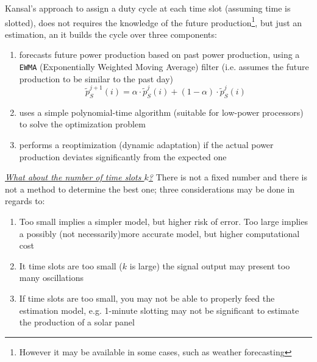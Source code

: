 Kansal's approach to assign a duty cycle at each time slot (assuming time is slotted), does not requires the knowledge of the future production\footnote{However it may be available in some cases, such as weather forecasting}, but just an estimation, an it builds the cycle over three components:
\begin{enumerate}
   \item forecasts future power production based on past power production, using a \texttt{EWMA} (Exponentially Weighted Moving Average) filter (i.e. assumes the future production to be similar to the past day)
   \begin{equation}
      \tilde{p}^{j+1}_S(i) = \alpha \cdot\tilde{p}^j_S(i) + (1-\alpha)\cdot\tilde{p}^j_S(i)
   \end{equation}
   \item uses a simple polynomial-time algorithm (suitable for low-power processors) to solve the
   optimization problem
   \item performs a reoptimization (dynamic adaptation) if the actual power production deviates
   significantly from the expected one
\end{enumerate}



\textit{\ul{What about the number of time slots $k$?}} There is not a fixed number and there is not a method to determine the best one; three considerations may be done in regards to:

\begin{enumerate}
   \item Too small implies a simpler model, but higher risk of error. Too large implies a possibly (not necessarily)more accurate model, but higher computational cost
   \item It time slots are too small ($k$ is large) the signal output may present too many oscillations
   \item If time slots are too small, you may not be able to properly feed the estimation model, e.g. 1-minute slotting may not be significant to estimate the production of a solar panel
\end{enumerate}

